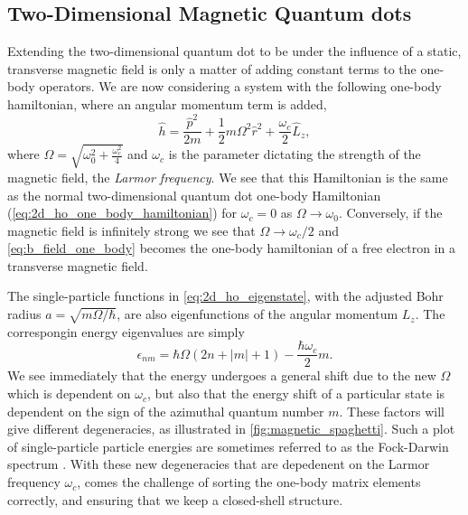 \subsection{Two-Dimensional Magnetic Quantum dots}

Extending the two-dimensional quantum dot to be under the influence of a 
static, transverse magnetic field is only a matter of adding constant 
terms to the one-body operators. We are now considering a system with 
the following one-body hamiltonian, where an angular momentum term is added,
\begin{equation}
    \label{eq:b_field_one_body}
    \hat{h} = \frac{\hat{p}^2}{2m} + \frac{1}{2}m\Omega^2\hat{r}^2 
        + \frac{\omega_c}{2}\hat{L}_z,   
\end{equation}
where $\Omega = \sqrt{\omega_0^2 + \frac{\omega_c^2}{4}}$ and $\omega_c$ is the 
parameter dictating the strength of the magnetic field, the \emph{Larmor frequency}.
We see that this Hamiltonian
is the same as the normal two-dimensional quantum dot one-body Hamiltonian 
(\autoref{eq:2d_ho_one_body_hamiltonian}) for $\omega_c = 0$ as $\Omega \to \omega_0$.
Conversely, if the 
magnetic field is infinitely strong we see that $\Omega \to \omega_c/2$ and 
\autoref{eq:b_field_one_body} becomes the one-body hamiltonian of a free electron in 
a transverse magnetic field.

\begin{figure}[h]

\end{figure}

The single-particle functions in
\autoref{eq:2d_ho_eigenstate}, with the adjusted Bohr radius $a=\sqrt{m\Omega/\hbar}$,
are also eigenfunctions of the angular momentum
$L_z$. The correspongin energy eigenvalues are simply
\begin{equation}
    \label{eq:2d_b_eigenvalues}
    \epsilon_{nm} = \hbar\Omega(2n + |m| + 1) - \frac{\hbar\omega_c}{2}m.
\end{equation}
We see immediately that the energy undergoes a general shift due to the new $\Omega$
which is dependent on $\omega_c$, but also that the energy shift of a particular state 
is dependent on the sign of the azimuthal quantum number $m$. These 
factors will give different degeneracies, as illustrated in \autoref{fig:magnetic_spaghetti}.
Such a plot of single-particle particle energies are sometimes referred to as the 
Fock-Darwin spectrum \cite{fock1928bemerkung,darwin1931diamagnetism}.
With these new degeneracies that are depedenent on the Larmor frequency $\omega_c$,
comes the challenge of sorting the one-body matrix elements correctly, 
and ensuring that we keep a closed-shell structure.

